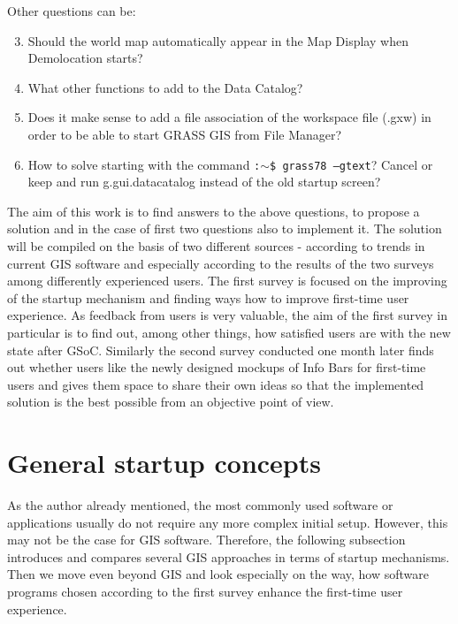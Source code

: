 \documentclass[a4paper,10pt,twoside]{article}
\begin{document}
\noindent Other questions can be:

\begin{enumerate}
\setcounter{enumi}{2}

 \item \noindent Should the world map automatically appear in the Map Display when Demolocation starts?
 
 \item \noindent What other functions to add to the Data Catalog?
 
 \item \noindent Does it make sense to add a file association of the workspace file (.gxw) in order to be able to start GRASS GIS from File Manager?
  
\item \noindent How to solve starting with the command \texttt{:$\sim$\$ grass78 --gtext}? Cancel or keep and run g.gui.datacatalog instead of the old startup screen?
 
\end{enumerate}

\noindent The aim of this work is to find answers to the above questions, to propose a solution and in the case of first two questions also to implement it. The solution will be compiled on the basis of two different sources - according to trends in current GIS software and especially according to the results of the two surveys among differently experienced users. The first survey is focused on the improving of the startup mechanism and finding ways how to improve first-time user experience. As feedback from users is very valuable, the aim of the first survey in particular is to find out, among other things, how satisfied users are with the new state after GSoC. Similarly the second survey conducted one month later finds out whether users like the newly designed mockups of Info Bars for first-time users and gives them space to share their own ideas so that the implemented solution is the best possible from an objective point of view.

\newpage
\vspace*{-1cm}
\section{General startup concepts}
\label{sec:startup_concepts}
\noindent
\large
As the author already mentioned, the most commonly used software or applications usually do not require any more complex initial setup. However, this may not be the case for GIS software. Therefore, the following subsection introduces and compares several GIS approaches in terms of startup mechanisms. Then we move even beyond GIS and look especially on the way, how software programs chosen according to the first survey enhance the first-time user experience.
\end{document}
